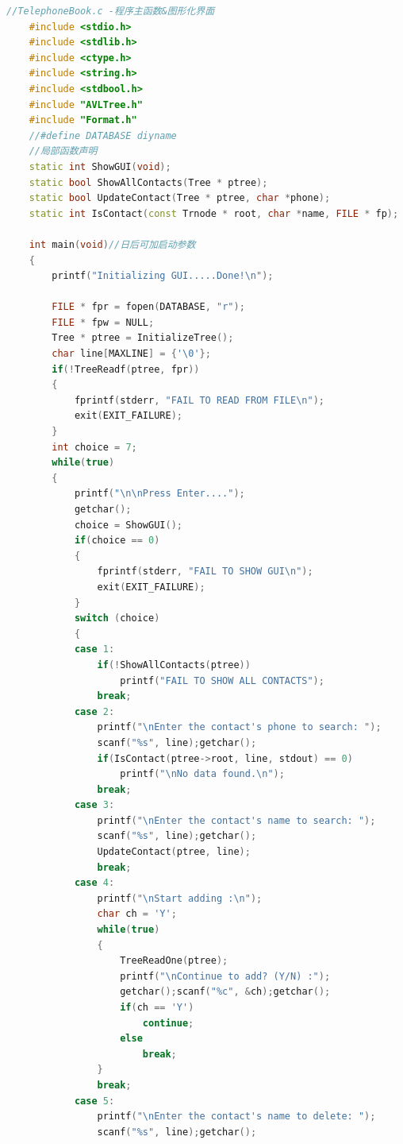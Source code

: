 \documentclass[12pt, a4paper, oneside]{ctexart}
\begin{document}
\begin{framed}
\begin{lstlisting}[language=C++]
    //TelephoneBook.c -程序主函数&图形化界面
    #include <stdio.h>
    #include <stdlib.h>
    #include <ctype.h>
    #include <string.h>
    #include <stdbool.h>
    #include "AVLTree.h"
    #include "Format.h"
    //#define DATABASE diyname
    //局部函数声明
    static int ShowGUI(void);
    static bool ShowAllContacts(Tree * ptree);
    static bool UpdateContact(Tree * ptree, char *phone);
    static int IsContact(const Trnode * root, char *name, FILE * fp);

    int main(void)//日后可加启动参数
    {
        printf("Initializing GUI.....Done!\n");
    
        FILE * fpr = fopen(DATABASE, "r");
        FILE * fpw = NULL;
        Tree * ptree = InitializeTree();
        char line[MAXLINE] = {'\0'};
        if(!TreeReadf(ptree, fpr))
        {
            fprintf(stderr, "FAIL TO READ FROM FILE\n");
            exit(EXIT_FAILURE);
        }
        int choice = 7;
        while(true)
        {   
            printf("\n\nPress Enter....");
            getchar();
            choice = ShowGUI();
            if(choice == 0)
            {
                fprintf(stderr, "FAIL TO SHOW GUI\n");
                exit(EXIT_FAILURE);
            }
            switch (choice)
            {
            case 1:
                if(!ShowAllContacts(ptree))
                    printf("FAIL TO SHOW ALL CONTACTS");
                break;
            case 2:
                printf("\nEnter the contact's phone to search: ");
                scanf("%s", line);getchar();
                if(IsContact(ptree->root, line, stdout) == 0)
                    printf("\nNo data found.\n");
                break;
            case 3:
                printf("\nEnter the contact's name to search: ");
                scanf("%s", line);getchar();
                UpdateContact(ptree, line);
                break;
            case 4:
                printf("\nStart adding :\n");
                char ch = 'Y';
                while(true)
                {
                    TreeReadOne(ptree);
                    printf("\nContinue to add? (Y/N) :");
                    getchar();scanf("%c", &ch);getchar();
                    if(ch == 'Y')
                        continue;
                    else
                        break;
                }
                break;
            case 5:
                printf("\nEnter the contact's name to delete: ");
                scanf("%s", line);getchar();

\end{lstlisting}
\end{framed}
\end{document}
